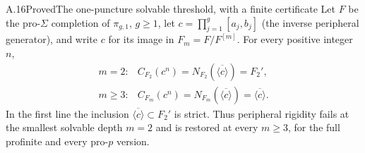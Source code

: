 \begin{claim}{A.16}{Proved}{The one-puncture solvable threshold, with a finite certificate}
Let $F$ be the pro-$\Sigma$ completion of $\pi_{g,1}$, $g\ge1$, let $c=\prod_{j=1}^g[a_j,b_j]$ (the inverse peripheral generator), and write $c$ for its image in $F_m=F/F^{[m]}$. For every positive integer $n$,
\[
\begin{array}{ll}
m=2:& C_{F_2}(c^n)=N_{F_2}(\overline{\langle c\rangle})=F_2',\\[2pt]
m\ge3:&C_{F_m}(c^n)=N_{F_m}(\overline{\langle c\rangle})
 =\overline{\langle c\rangle}.
\end{array}
\]
In the first line the inclusion $\overline{\langle c\rangle}\subset F_2'$ is strict. Thus peripheral rigidity fails at the smallest solvable depth $m=2$ and is restored at every $m\ge3$, for the full profinite and every pro-$p$ version.
\end{claim}

